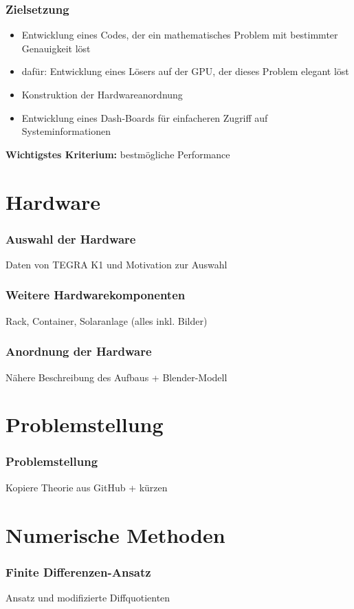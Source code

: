\documentclass[12pt]{beamer}
\newcommand{\highlight}[1]{{\color{blue}\bf#1}}
\begin{document}
\begin{frame}[c]
\frametitle{Zielsetzung}
\begin{itemize}
\item Entwicklung eines Codes, der ein mathematisches Problem mit bestimmter Genauigkeit löst \\
\item dafür: Entwicklung eines Lösers auf der GPU, der dieses Problem elegant löst 
\item Konstruktion der Hardwareanordnung \\
\item Entwicklung eines Dash-Boards für einfacheren Zugriff auf Systeminformationen
\end{itemize}
\highlight{Wichtigstes Kriterium:}
bestmögliche Performance
\end{frame}

\section{Hardware}
\begin{frame}[c]
\frametitle{Auswahl der Hardware}
Daten von TEGRA K1 und Motivation zur Auswahl
\end{frame}


\begin{frame}[c]
\frametitle{Weitere Hardwarekomponenten}
Rack, Container, Solaranlage (alles inkl. Bilder)
\end{frame}

\begin{frame}[c]
\frametitle{Anordnung der Hardware}
Nähere Beschreibung des Aufbaus + Blender-Modell
\end{frame}
\section{Problemstellung}
\begin{frame}[c]
\frametitle{Problemstellung}
Kopiere Theorie aus GitHub + kürzen
\end{frame}

\section{Numerische Methoden}
\begin{frame}[c]
\frametitle{Finite Differenzen-Ansatz}
Ansatz und modifizierte Diffquotienten
\end{frame}
\end{document}
